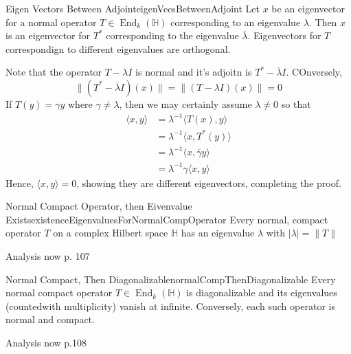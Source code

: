\documentclass[oneside]{book}
\renewcommand{\H}{\mathbb{H}}
\newcommand{\oln}{\overline}
\newcommand{\End}{\operatorname{End}}
\begin{document}
\begin{lem}{Eigen Vectors Between Adjoint}{eigenVecsBetweenAdjoint}
	Let $x$ be an eigenvector for a normal operator $T \in \End_k(\H)$ corresponding to an eigenvalue
	$\lambda$. Then $x$ is an eigenvector for $T^*$ corresponding to the eigenvalue $\oln{\lambda}$.
	Eigenvectors for $T$ correspondign to different eigenvalues are orthogonal.
\end{lem}

\begin{Proof}
	Note that the operator $T - \lambda I$ is normal and it's adjoitn is $T^* - \oln{\lambda}I$. COnversely,
	\[
		\|(T^* - \oln{\lambda}I)(x)\| = \|(T-  \lambda I)(x)\| = 0
	\]
	If $T(y) = \gamma y$ where $\gamma \ne \lambda$, then we may certainly assume $\lambda \ne 0$ so that
	\begin{align*}
		\langle x,y  \rangle &= \lambda^{-1} \langle T(x), y \rangle\\
							 &= \lambda^{-1} \langle x, T^*(y) \rangle\\
							 &= \lambda^{-1} \langle x, \oln{\gamma}y \rangle\\
							 &= \lambda^{-1}\gamma \langle x,y \rangle
	\end{align*}
	Hence, $ \langle x,y \rangle = 0$, showing they are different eigenvectors, completing the proof.
\end{Proof}


\begin{lem}{Normal Compact Operator, then Eivenvalue Exists}{existenceEigenvaluesForNormalCompOperator}
	Every normal, compact operator $T$ on a complex Hilbert space $\H$ has an eigenvalue $\lambda$ with
	$|\lambda| = \|T\|$
\end{lem}

\begin{Proof}
	Analysis now p. 107
\end{Proof}

\begin{thm}{Normal Compact, Then Diagonalizable}{normalCompThenDiagonalizable}
	Every normal compact operator $T \in \End_k(\H)$ is diagonalizable and its eigenvalues (countedwith
	multiplicity) vanish at infinite. Conversely, each such operator is normal and compact.
\end{thm}

\begin{Proof}
	Analysis now p.108
\end{Proof}
\end{document}
